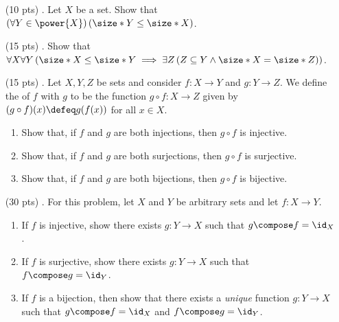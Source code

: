 \begin{enumerate}
  \item[(10 pts) \quad 1.]
    Let $X$ be a set.
    Show that $\left(\forall Y \in \power{X}\right)\left(\size*{Y} \leq \size*{X}\right)$.

  \item[(15 pts) \quad 2.]
    Show that $\forall X \forall Y \left(\size*{X} \leq  \size*{Y} \implies \exists Z \left(Z \subseteq Y \land \size*{X} = \size*{Z}\right)\right)$.

  \item[(15 pts) \quad 3.]
    Let $X, Y, Z$ be sets and consider
    $f: X \to Y$ and $g: Y \to Z$.%
    We define the  of $f$ with $g$ to be the function
    $g \circ f: X \to Z$ given by
    $(g \circ f)(x) \defeq g(f(x))$
    for all $x \in X$.
    \begin{enumerate}
      \item
        Show that, if $f$ and $g$ are both injections,
        then $g \circ f$ is injective.
      \item
        Show that, if $f$ and $g$ are both surjections,
        then $g \circ f$ is surjective.
      \item
        Show that, if $f$ and $g$ are both bijections,
        then $g \circ f$ is bijective.
    \end{enumerate}

  \item[(30 pts) \quad 4.]
    For this problem, let $X$ and $Y$ be arbitrary sets and let $f: X \to Y$.
    \begin{enumerate}
      \item
        If $f$ is injective, show there exists $g: Y \to X$ such that $g \compose f = \id_X$.
      \item
        If $f$ is surjective, show there exists $g: Y \to X$ such that $f \compose g = \id_Y$.
      \item
        If $f$ is a bijection, then show that there exists a \emph{unique} function $g: Y \to X$ such that $g \compose f = \id_X$ and $f \compose g = \id_Y$.
    \end{enumerate}


\end{enumerate}
